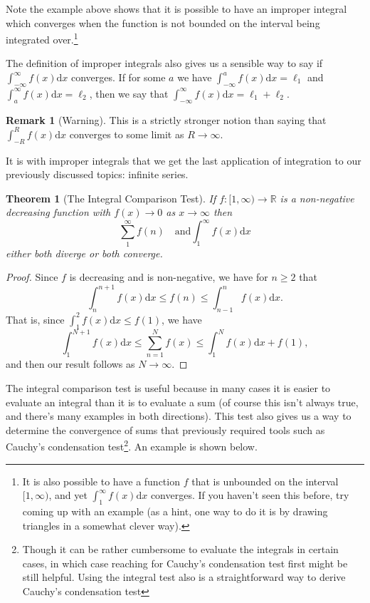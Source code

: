 \documentclass[11pt, a4paper]{article}
\newtheorem{theorem}{Theorem}[section]
\theoremstyle{definition}
\newtheorem*{remark}{Remark}
\newcommand{\R}{\mathbb{R}}
\newcommand{\dd}{\mathrm{d}}
\begin{document}
Note the example above shows that it is possible to have an improper integral which converges when the function is not bounded on the interval being integrated over.\footnote{It is also possible to have a function $f$ that is unbounded on the interval $[1, \infty)$, and yet $\int_1^{\infty} f(x) \dd x$ converges. If you haven't seen this before, try coming up with an example (as a hint, one way to do it is by drawing triangles in a somewhat clever way).} 

The definition of improper integrals also gives us a sensible way to say if $\int_{-\infty}^{\infty} f(x) \dd x$ converges. If for some $a$ we have $\int_{-\infty}^{a} f(x) \dd x = \ell_1$ and $\int_{a}^{\infty} f(x) \dd x = \ell_2$, then we say that $\int_{-\infty}^{\infty} f(x) \dd x = \ell_1 + \ell_2$.

\begin{remark}[Warning]
	This is a strictly stronger notion than saying that $\int_{-R}^{R} f(x) \dd x$ converges to some limit as $R \rightarrow \infty$.
\end{remark}

It is with improper integrals that we get the last application of integration to our previously discussed topics: infinite series. 

\begin{theorem}[The Integral Comparison Test]
	If $f:[1, \infty) \rightarrow \R$ is a non-negative decreasing function with $f(x) \rightarrow 0$ as $x \rightarrow \infty$ then
	$$
	\sum_1^{\infty} f(n) \quad \text{and} \int_1^{\infty} f(x) \dd x
	$$
	either both diverge or both converge.
\end{theorem}
\begin{proof}
	Since $f$ is decreasing and is non-negative, we have for $n \geq 2$ that
	$$
	\int_n^{n + 1} f(x) \dd x \leq f(n) \leq \int_{n - 1}^n f(x) \dd x.
	$$
	That is, since $\int_1^2 f(x) \dd x \leq f(1)$, we have
	$$
	\int_1^{N + 1} f(x) \dd x \leq \sum_{n= 1}^N f(x) \leq \int_1^N f(x) \dd x + f(1),
	$$
	and then our result follows as $N \rightarrow \infty$.
\end{proof}

The integral comparison test is useful because in many cases it is easier to evaluate an integral than it is to evaluate a sum (of course this isn't always true, and there's many examples in both directions). This test also gives us a way to determine the convergence of sums that previously required tools such as Cauchy's condensation test\footnote{Though it can be rather cumbersome to evaluate the integrals in certain cases, in which case reaching for Cauchy's condensation test first might be still helpful. Using the integral test also is a straightforward way to derive Cauchy's condensation test}. An example is shown below.
\end{document}

